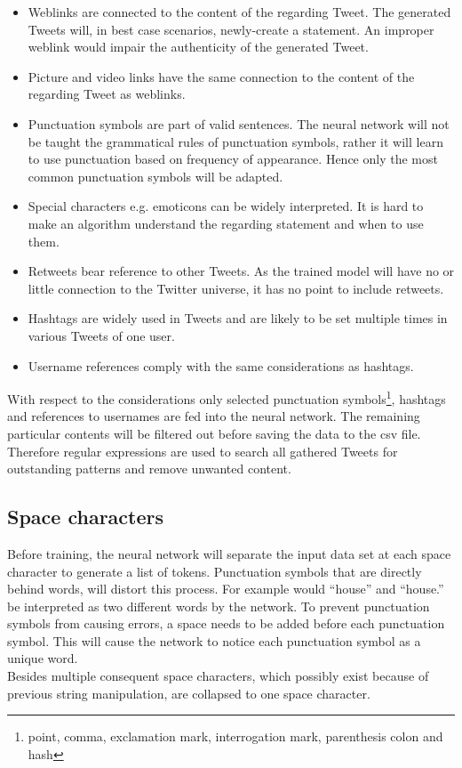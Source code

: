 \documentclass[conference]{IEEEtran}
\begin{document}
\begin{itemize}
\item Weblinks are connected to the content of the regarding Tweet. The generated Tweets will, in best case scenarios, newly-create a statement. An improper weblink would impair the authenticity of the generated Tweet.
\item Picture and video links have the same connection to the content of the regarding Tweet as weblinks.
\item Punctuation symbols are part of valid sentences. The neural network will not be taught the grammatical rules of punctuation symbols, rather it will learn to use punctuation based on frequency of appearance. Hence only the most common punctuation symbols will be adapted.
\item Special characters e.g. emoticons can be widely interpreted. It is hard to make an algorithm understand the regarding statement and when to use them. 
\item Retweets bear reference to other Tweets. As the trained model will have no or little connection to the Twitter universe, it has no point to include retweets.
\item Hashtags are widely used in Tweets and are likely to be set multiple times in various Tweets of one user.
\item Username references comply with the same considerations as hashtags.
\end{itemize}

With respect to the considerations only selected punctuation symbols\footnote{point, comma, exclamation mark, interrogation mark, parenthesis colon and hash},  hashtags and references to usernames are fed into the neural network. The remaining particular contents will be filtered out before saving the data to the csv file. Therefore regular expressions are used to search all gathered Tweets for outstanding patterns and remove unwanted content.

\subsection{Space characters}\label{subsec_space_characters}

Before training, the neural network will separate the input data set at each space character to generate a list of tokens. Punctuation symbols that are directly behind words, will distort this process. For example would ``house'' and ``house.'' be interpreted as two different words by the network. To prevent punctuation symbols from causing errors, a space needs to be added before each punctuation symbol. This will cause the network to notice each punctuation symbol as a unique word.\\
Besides multiple consequent space characters, which possibly exist because of previous string manipulation, are collapsed to one space character.
\end{document}
